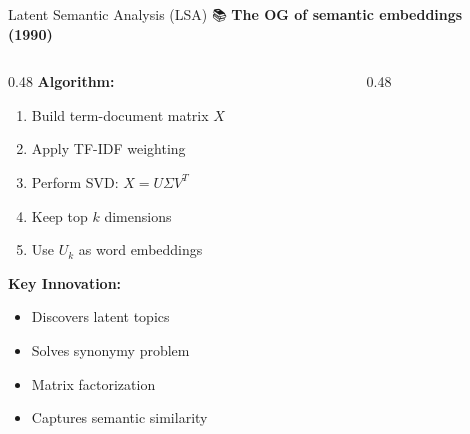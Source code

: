 \documentclass[aspectratio=169]{beamer}
\begin{document}
\begin{frame}[shrink=10]{Latent Semantic Analysis (LSA) 📚}
\textbf{The OG of semantic embeddings (1990)}

\vspace{1em}

\begin{columns}[T]
\begin{column}{0.48\textwidth}
\textbf{Algorithm:}
\begin{enumerate}\setlength{\itemsep}{0pt}
    \item Build term-document matrix $X$
    \item Apply TF-IDF weighting
    \item Perform SVD: $X = U\Sigma V^T$
    \item Keep top $k$ dimensions
    \item Use $U_k$ as word embeddings
\end{enumerate}

\vspace{0.5em}
\textbf{Key Innovation:}
\begin{itemize}\setlength{\itemsep}{0pt}
    \item Discovers latent topics
    \item Solves synonymy problem
    \item Matrix factorization
    \item Captures semantic similarity
\end{itemize}
\end{column}

\begin{column}{0.48\textwidth}
\begin{center}
\end{center}


\end{column}
\end{columns}
\end{frame}
\end{document}
